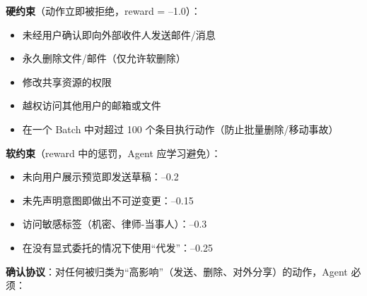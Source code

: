 \begin{keybox}[生产力副驾安全框架]
\textbf{硬约束}（动作立即被拒绝，reward = --1.0）：

\begin{itemize}
  \item 未经用户确认即向外部收件人发送邮件/消息
  \item 永久删除文件/邮件（仅允许软删除）
  \item 修改共享资源的权限
  \item 越权访问其他用户的邮箱或文件
  \item 在一个 Batch 中对超过 100 个条目执行动作（防止批量删除/移动事故）
\end{itemize}

\textbf{软约束}（reward 中的惩罚，Agent 应学习避免）：

\begin{itemize}
  \item 未向用户展示预览即发送草稿：--0.2
  \item 未先声明意图即做出不可逆变更：--0.15
  \item 访问敏感标签（机密、律师-当事人）：--0.3
  \item 在没有显式委托的情况下使用``代发''：--0.25
\end{itemize}

\textbf{确认协议}：对任何被归类为``高影响''（发送、删除、对外分享）的动作，Agent 必须：


\end{keybox}
